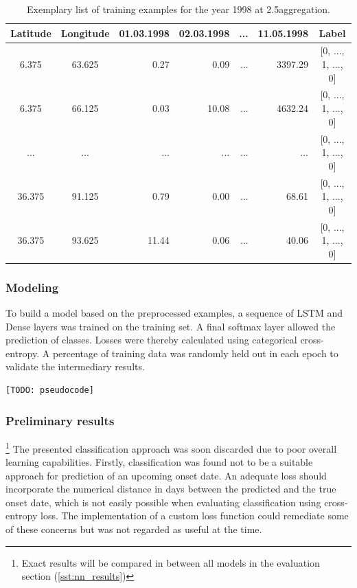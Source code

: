 \begin{table}[h]
  \centering
  \begin{tabular}{|ccrrrr||c|}
    \hline
    Latitude & Longitude & 01.03.1998 & 02.03.1998 & ... & 11.05.1998 & Label \\
    \hline
    \hline
    6.375 & 63.625 & 0.27 & 0.09 & ... & 3397.29 & [0, ..., 1, ..., 0] \\
    6.375 & 66.125 & 0.03 & 10.08 & ... & 4632.24 & [0, ..., 1, ..., 0] \\
    ... & ... & ... & ... & ... & ... & [0, ..., 1, ..., 0] \\
    36.375 & 91.125 & 0.79 & 0.00 & ... & 68.61 & [0, ..., 1, ..., 0] \\
    36.375 & 93.625 & 11.44 & 0.06 & ... & 40.06 & [0, ..., 1, ..., 0] \\
    \hline
  \end{tabular}
  \caption{Exemplary list of training examples for the year 1998 at 2.5\degree aggregation.}
  \label{tab:nn_t2_data}
\end{table}

\subsubsection{Modeling}
\label{ssst:nn_t2_model}
To build a model based on the preprocessed examples, a sequence of LSTM and Dense layers was trained on the training set. A final softmax layer allowed the prediction of classes. Losses were thereby calculated using categorical cross-entropy. A percentage of training data was randomly held out in each epoch to validate the intermediary results.

\begin{figure}[h]
\end{figure}

\begin{lstlisting}[language=Python]
  [TODO: pseudocode]
\end{lstlisting}

\subsubsection{Preliminary results}{\footnote{Exact results will be compared in between all models in the evaluation section (\cref{sst:nn_results})}}
\label{ssst:nn_t2_results}
The presented classification approach was soon discarded due to poor overall learning capabilities. Firstly, classification was found not to be a suitable approach for prediction of an upcoming onset date. An adequate loss should incorporate the numerical distance in days between the predicted and the true onset date, which is not easily possible when evaluating classification using cross-entropy loss. The implementation of a custom loss function could remediate some of these concerns but was not regarded as useful at the time.

